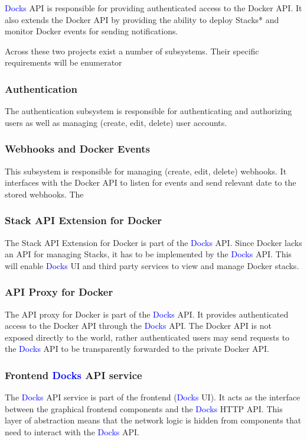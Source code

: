 \documentclass[]{article}
\newcommand{\docks}{\textcolor{Blue}{Docks} }
\newcommand{\docker}{Docker }
\begin{document}
\docks API is responsible for providing authenticated access to the \docker API.
It also extends the \docker API by providing the ability to deploy Stacks*
and monitor \docker events for sending notifications.

Across these two projects exist a number of subsystems.
Their specific requirements will be enumerator

\subsubsection{Authentication}
The authentication subsystem is responsible for authenticating
and authorizing users as well as managing (create, edit, delete) user accounts.

\subsubsection{Webhooks and Docker Events}
This subsystem is responsible for managing (create, edit, delete) webhooks.
It interfaces with the Docker API to listen for events and send relevant
date to the stored webhooks. The

\subsubsection{Stack API Extension for Docker}
The Stack API Extension for \docker is part of the \docks API.
Since \docker lacks an API for managing Stacks, it has to be implemented
by the \docks API. This will enable \docks UI and third party services
to view and manage \docker stacks.

\subsubsection{API Proxy for \docker}
The API proxy for \docker is part of the \docks API. It provides authenticated
access to the \docker API through the \docks API. The \docker API is not
exposed directly to the world, rather authenticated users may send
requests to the \docks API to be transparently forwarded to the
private \docker API.

\subsubsection{Frontend \docks API service}
The \docks API service is part of the frontend (\docks UI). It acts as the interface
between the graphical frontend components and the \docks HTTP API.
This layer of abstraction means that the network logic is hidden from
components that need to interact with the \docks API.
\end{document}
